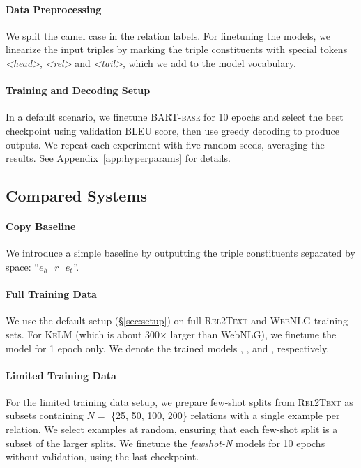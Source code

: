 \paragraph{Data Preprocessing} We split the camel case in the relation labels. For finetuning the models, we linearize the input triples by marking the triple constituents with special tokens \textit{<head>}, \textit{<rel>} and \textit{<tail>}, which we add to the model vocabulary.

\paragraph{Training and Decoding Setup} In a default scenario, we finetune BART\textsc{-base} for 10 epochs and select the best checkpoint using validation BLEU score, then use greedy decoding to produce outputs. We repeat each experiment with five random seeds, averaging the results. See Appendix~\ref{app:hyperparams} for details.


\subsection{Compared Systems}
\label{sec:experiments}
\paragraph{Copy Baseline} We introduce a simple baseline by outputting the triple constituents separated by space: ``$e_h\text{ }r\text{ }e_t$''.



\paragraph{Full Training Data} We use the default setup (§\ref{sec:setup}) on full \textsc{Rel2Text} and \textsc{WebNLG} training sets. For \textsc{KeLM} (which is about 300$\times$ larger than WebNLG), we finetune the model for 1 epoch only. We denote the trained models \BARTr{}, \BARTw{}, and \BARTk{}, respectively.

\paragraph{Limited Training Data} For the limited training data setup, we prepare few-shot splits from \textsc{Rel2Text} as subsets containing $N=$ \{25, 50, 100, 200\} relations with a single example per relation. We select examples at random, ensuring that each few-shot split is a subset of the larger splits. We finetune the \textit{fewshot-N} models for 10 epochs without validation, using the last checkpoint.

